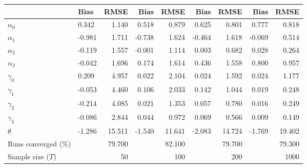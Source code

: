 
\begin{tabular}[t]{llrrrrrrr}
\toprule
  & Bias & RMSE & Bias & RMSE & Bias & RMSE & Bias & RMSE\\
\midrule
$\alpha_{0}$ & 0.342 & 1.140 & 0.518 & 0.879 & 0.625 & 0.801 & 0.777 & 0.818\\
$\alpha_{1}$ & -0.981 & 1.711 & -0.738 & 1.624 & -0.464 & 1.618 & -0.069 & 0.514\\
$\alpha_{2}$ & -0.119 & 1.557 & -0.001 & 1.114 & 0.003 & 0.682 & 0.028 & 0.264\\
$\alpha_{3}$ & -0.042 & 1.696 & 0.174 & 1.614 & 0.436 & 1.558 & 0.800 & 0.957\\
$\gamma_{0}$ & 0.209 & 4.957 & 0.022 & 2.104 & 0.024 & 1.592 & 0.024 & 1.177\\
$\gamma_{1}$ & -0.053 & 4.460 & 0.106 & 2.033 & 0.142 & 1.044 & 0.019 & 0.248\\
$\gamma_{2}$ & -0.214 & 4.085 & 0.021 & 1.353 & 0.057 & 0.780 & 0.016 & 0.249\\
$\gamma_{3}$ & -0.086 & 2.844 & 0.044 & 0.972 & 0.069 & 0.566 & 0.009 & 0.149\\
$\theta$ & -1.286 & 15.511 & -1.540 & 11.641 & -2.083 & 14.724 & -1.769 & 19.402\\
Runs converged (\%) &  & 79.700 &  & 82.100 &  & 79.700 &  & 79.300\\
Sample size ($T$) &  & 50 &  & 100 &  & 200 &  & 1000\\
\bottomrule
\end{tabular}
